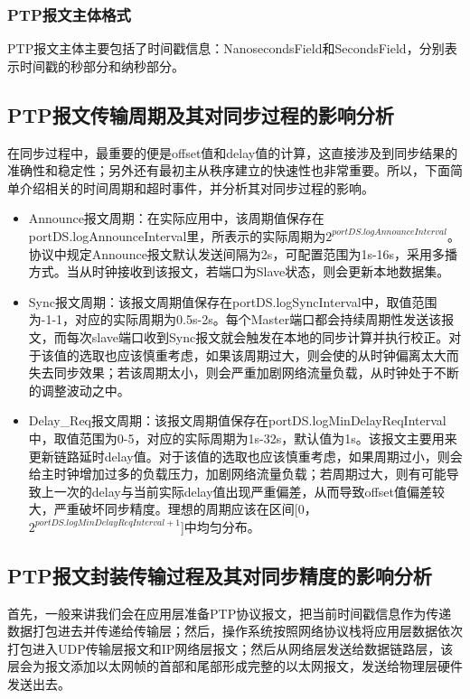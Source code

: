\subsubsection{PTP报文主体格式}
PTP报文主体主要包括了时间戳信息：NanosecondsField和SecondsField，分别表示时间戳的秒部分和纳秒部分。

\subsection{PTP报文传输周期及其对同步过程的影响分析}
在同步过程中，最重要的便是offset值和delay值的计算，这直接涉及到同步结果的准确性和稳定性；另外还有最初主从秩序建立的快速性也非常重要。所以，下面简单介绍相关的时间周期和超时事件，并分析其对同步过程的影响。
\begin{itemize}[noitemsep,topsep=0pt,parsep=0pt,partopsep=0pt]
	\item Announce报文周期：在实际应用中，该周期值保存在portDS.logAnnounceInterval里，所表示的实际周期为$2^{portDS.logAnnounceInterval}$。协议中规定Announce报文默认发送间隔为2s，可配置范围为1s-16s，采用多播方式。当从时钟接收到该报文，若端口为Slave状态，则会更新本地数据集。
	\item Sync报文周期：该报文周期值保存在portDS.logSyncInterval中，取值范围为-1-1，对应的实际周期为0.5s-2s。每个Master端口都会持续周期性发送该报文，而每次slave端口收到Sync报文就会触发在本地的同步计算并执行校正。对于该值的选取也应该慎重考虑，如果该周期过大，则会使的从时钟偏离太大而失去同步效果；若该周期太小，则会严重加剧网络流量负载，从时钟处于不断的调整波动之中。
	\item Delay\_Req报文周期：该报文周期值保存在portDS.logMinDelayReqInterval中，取值范围为0-5，对应的实际周期为1s-32s，默认值为1s。该报文主要用来更新链路延时delay值。对于该值的选取也应该慎重考虑，如果周期过小，则会给主时钟增加过多的负载压力，加剧网络流量负载；若周期过大，则有可能导致上一次的delay与当前实际delay值出现严重偏差，从而导致offset值偏差较大，严重破坏同步精度。理想的周期应该在区间[0， $2^{portDS.logMinDelayReqInterval+1}$]中均匀分布。
\end{itemize}

\subsection{PTP报文封装传输过程及其对同步精度的影响分析}
首先，一般来讲我们会在应用层准备PTP协议报文，把当前时间戳信息作为传递数据打包进去并传递给传输层；然后，操作系统按照网络协议栈将应用层数据依次打包进入UDP传输层报文和IP网络层报文；然后从网络层发送给数据链路层，该层会为报文添加以太网帧的首部和尾部形成完整的以太网报文，发送给物理层硬件发送出去。

